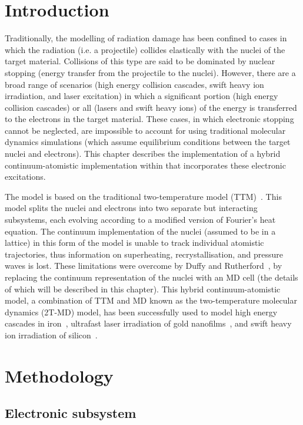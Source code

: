 \section{Introduction}

Traditionally, the modelling of radiation damage has been confined to
cases in which the radiation (i.e. a projectile) collides elastically with the
nuclei of the target material. Collisions of this type are said to be
dominated by nuclear stopping (energy transfer from the projectile
to the nuclei). However, there are a broad range of scenarios (high
energy collision cascades, swift heavy ion irradiation, and laser
excitation) in which a significant portion (high energy collision cascades)
or all (lasers and swift heavy ions) of the energy is transferred to the
electrons in the target material. These cases, in which electronic stopping
cannot be neglected, are impossible to account for using traditional
molecular dynamics simulations (which assume equilibrium conditions
between the target nuclei and electrons). This chapter describes the
implementation of a hybrid continuum-atomistic implementation within \D
that incorporates these electronic excitations.

The model is based on the traditional two-temperature model
(TTM)~\cite{lifshits-60a}. This model splits the nuclei and electrons
into two separate but interacting subsystems, each evolving according
to a modified version of Fourier's heat equation. The continuum
implementation of the nuclei (assumed to be in a lattice) in this form of
the model is unable to track individual atomistic trajectories, thus information
on superheating, recrystallisation, and pressure waves is lost. These limitations
were overcome by Duffy and Rutherford~\cite{duffy-07a, duffy-09a}, by replacing
the continuum representation of the nuclei with an MD cell (the details of
which will be described in this chapter). This hybrid continuum-atomistic model,
a combination of TTM and MD known as the two-temperature molecular
dynamics (2T-MD) model, has been successfully used to model high energy
cascades in iron~\cite{zarkadoula-14a}, ultrafast laser irradiation of gold
nanofilms~\cite{daraszewicz-13a}, and swift heavy ion irradiation of silicon~\cite{khara-16a}.

\section{Methodology}

\subsection*{Electronic subsystem}

